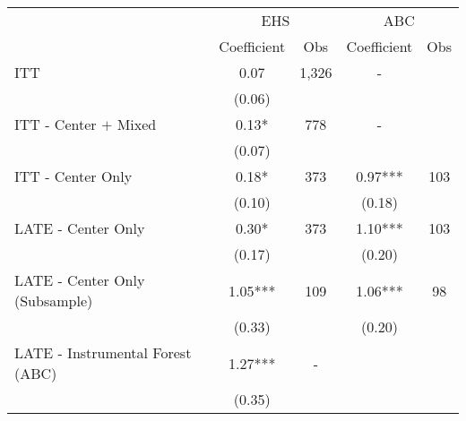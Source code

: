 \begin{tabular}{lcccc}
\toprule 
\midrule 
 & \multicolumn{2}{c}{EHS} & \multicolumn{2}{c}{ABC} \\
 \cmidrule(lr){2-3} \cmidrule(lr){4-5} 
 & Coefficient & Obs & Coefficient & Obs \\
\midrule 
ITT & 0.07 & 1,326 & - \\
 & (0.06) &  \\
ITT - Center $+$ Mixed & 0.13* & 778 & - \\
 & (0.07) &  \\
ITT - Center Only & 0.18* & 373 & 0.97*** & 103 \\
 & (0.10) &  & (0.18) &  \\
LATE - Center Only & 0.30* & 373 & 1.10*** & 103 \\
 & (0.17) &  & (0.20) &  \\
LATE - Center Only (Subsample) & 1.05*** & 109 & 1.06*** & 98 \\
 & (0.33) &  & (0.20) &  \\
LATE - Instrumental Forest (ABC) & 1.27*** & - \\
 & (0.35) \\
\midrule 
\bottomrule 
\end{tabular}
